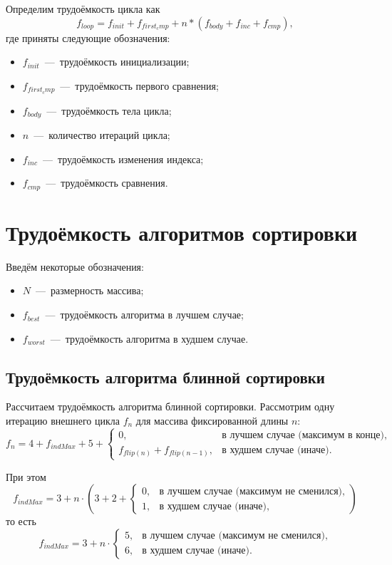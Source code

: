 Определим трудоёмкость цикла как
\begin{equation}
	f_{loop} = f_{init} + f_{first_cmp} + n * (f_{body} + f_{inc} + f_{cmp}),
\end{equation}
где приняты следующие обозначения:
\begin{itemize}
	\item $f_{init}$~---~трудоёмкость инициализации;
	\item $f_{first_cmp}$~---~трудоёмкость первого сравнения;
	\item $f_{body}$~---~трудоёмкость тела цикла;
	\item $n$~---~количество итераций цикла;
	\item $f_{inc}$~---~трудоёмкость изменения индекса;
	\item $f_{cmp}$~---~трудоёмкость сравнения.
\end{itemize}

\section{Трудоёмкость алгоритмов сортировки}
Введём некоторые обозначения:
\begin{itemize}
	\item $N$~---~размерность массива;
	\item $f_{best}$~---~трудоёмкость алгоритма в лучшем случае;
	\item $f_{worst}$~---~трудоёмкость алгоритма в худшем случае.
\end{itemize}

\subsection{Трудоёмкость алгоритма блинной сортировки}
Рассчитаем трудоёмкость алгоритма блинной сортировки. Рассмотрим одну итерацию внешнего цикла $f_{n}$ для массива фиксированной длины $n$:
\begin{equation}
	f_{n} = 4 + f_{indMax} + 5 + \begin{cases}
		0,& \text{в лучшем случае (максимум в конце)}, \\
		f_{flip(n)} + f_{flip(n-1)},& \text{в худшем случае (иначе)}.
	\end{cases}
\end{equation}

При этом
\begin{equation}
	f_{indMax} = 3 + n \cdot  (3 + 2 + \begin{cases}
		0,& \text{в лучшем случае (максимум не сменился)}, \\
		1,& \text{в худшем случае (иначе)},
	\end{cases})
\end{equation}
то есть
\begin{equation}
	f_{indMax} = 3 + n \cdot  \begin{cases}
		5,& \text{в лучшем случае (максимум не сменился)}, \\
		6,& \text{в худшем случае (иначе)}.
	\end{cases}
\end{equation}

